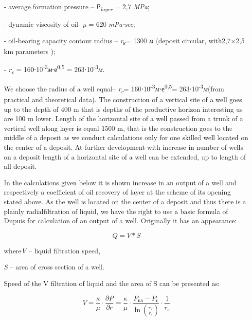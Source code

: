 \begin{multicols}{2}
- average formation pressure -- \emph{Р\textsubscript{layer}} = 2,7
\emph{MPa};

- dynamic viscosity of oil- \emph{µ} = 620 \emph{mPa⋅sec};

- oil-bearing capacity contour radius -- \emph{r\textsubscript{к}}= 1300
\emph{м} (deposit circular, with2,7×2,5 km parameters );

- \emph{r\textsubscript{c}} =
160⋅10\textsuperscript{-3}\emph{м}⋅е\textsuperscript{0,5} =
263⋅10\textsuperscript{-3}\emph{м}.

We choose the radius of a well equal-- \emph{r\textsubscript{c}}=
160⋅10\textsuperscript{-3}\emph{м}⋅е\textsuperscript{0,5}=
263⋅10\textsuperscript{-3}\emph{м}(from practical and theoretical data).
The construction of a vertical site of a well goes up to the depth of
400 m that is depths of the productive horizon interesting us are 100 m
lower. Length of the horizontal site of a well passed from a trunk of a
vertical well along layer is equal 1500 m, that is the construction goes
to the middle of a deposit as we conduct calculations only for one
skilled well located on the center of a deposit. At further development
with increase in number of wells on a deposit length of a horizontal
site of a well can be extended, up to length of all deposit.

In the calculations given below it is shown increase in an output of a
well and respectively a coefficient of oil recovery of layer at the
scheme of its opening stated above. As the well is located on the center
of a deposit and thus there is a plainly radialfiltration of liquid, we
have the right to use a basic formula of Dupuis for calculation of an
output of a well. Originally it has an appearance:

\begin{equation}
Q=V*S
\end{equation}

where\emph{V} -- liquid filtration speed,

\emph{S} -- area of cross section of a well.

Speed of the V filtration of liquid and the area of S can be presented
as:

\begin{equation}
  V = \frac{\kappa}{\mu} \cdot \frac{\partial P}{\partial r} = \frac{\kappa}{\mu} \cdot \frac{P_{\text{пл}} - P_{\text{с}}}{\ln \left( \frac{r_{\text{k}}}{r_{\text{c}}} \right)} \cdot \frac{1}{r_{\text{c}}}
\end{equation}


\end{multicols}
